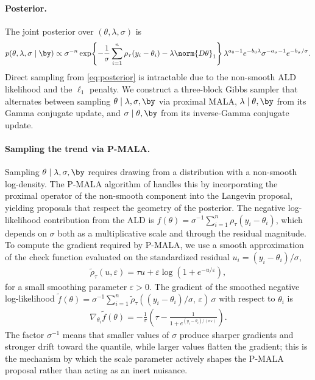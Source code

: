 \paragraph{Posterior.}
The joint posterior over $(\theta, \lambda, \sigma)$ is
\begin{equation}
    p(\theta, \lambda, \sigma \mid \by) \propto
    \sigma^{-n}
    \exp\!\left\{-\frac{1}{\sigma}\sum_{i=1}^n \rho_\tau(y_i - \theta_i)
    - \lambda \norm{D\theta}_1\right\}
    \lambda^{a_0 - 1} e^{-b_0 \lambda}
    \sigma^{-a_\sigma - 1} e^{-b_\sigma / \sigma}.
    \label{eq:posterior}
\end{equation}
Direct sampling from \eqref{eq:posterior} is intractable due to the non-smooth ALD likelihood and the $\ell_1$ penalty. We construct a three-block Gibbs sampler that alternates between sampling $\theta \mid \lambda, \sigma, \by$ via proximal MALA, $\lambda \mid \theta, \by$ from its Gamma conjugate update, and $\sigma \mid \theta, \by$ from its inverse-Gamma conjugate update.

\paragraph{Sampling the trend via P-MALA.}
Sampling $\theta \mid \lambda, \sigma, \by$ requires drawing from a distribution with a non-smooth log-density. The P-MALA algorithm of \citet{pereyra2016proximal} handles this by incorporating the proximal operator of the non-smooth component into the Langevin proposal, yielding proposals that respect the geometry of the posterior. The negative log-likelihood contribution from the ALD is $f(\theta) = \sigma^{-1}\sum_{i=1}^n \rho_\tau(y_i - \theta_i)$, which depends on $\sigma$ both as a multiplicative scale and through the residual magnitude. To compute the gradient required by P-MALA, we use a smooth approximation of the check function evaluated on the standardized residual $u_i = (y_i - \theta_i)/\sigma$,
\begin{align*}
    \tilde{\rho}_\tau(u, \varepsilon) =
    \tau u + \varepsilon \log\!\left(1 + e^{-u/ \varepsilon}\right),
\end{align*}
for a small smoothing parameter $\varepsilon > 0$. The gradient of the smoothed negative log-likelihood $\tilde{f}(\theta) = \sigma^{-1}\sum_{i=1}^n \tilde{\rho}_\tau((y_i - \theta_i)/\sigma,\, \varepsilon)\,\sigma$ with respect to $\theta_i$ is
\begin{align*}
    \nabla_{\theta_i} \tilde{f}(\theta)
    = -\frac{1}{\sigma}\left(\tau -
    \frac{1}{1 + e^{(y_i - \theta_i)/(\sigma \varepsilon)}}\right).
\end{align*}
The factor $\sigma^{-1}$ means that smaller values of $\sigma$ produce sharper gradients and stronger drift toward the quantile, while larger values flatten the gradient; this is the mechanism by which the scale parameter actively shapes the P-MALA proposal rather than acting as an inert nuisance.

